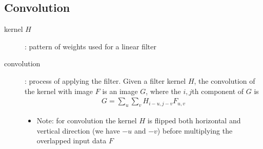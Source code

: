 \documentclass[letterpaper,12pt]{article}
\begin{document}
\subsection{Convolution}
\begin{description}
 \item[kernel $H$]: pattern of weights used for a linear filter
 \item[convolution]: process of applying the filter. Given a filter kernel $H$, the convolution of the kernel with image $F$ is an image $G$, where the $i,j$th component of $G$ is
       \begin{align}
        G = \sum\limits_{u}\sum\limits_{v} H_{i-u,j-v} F_{u,v}
       \end{align}
       \begin{itemize}
        \item Note: for convolution the kernel $H$ is flipped both horizontal and vertical direction (we have $-u$ and $-v$) before multiplying the overlapped input data $F$
       \end{itemize}
\end{description}
\end{document}
